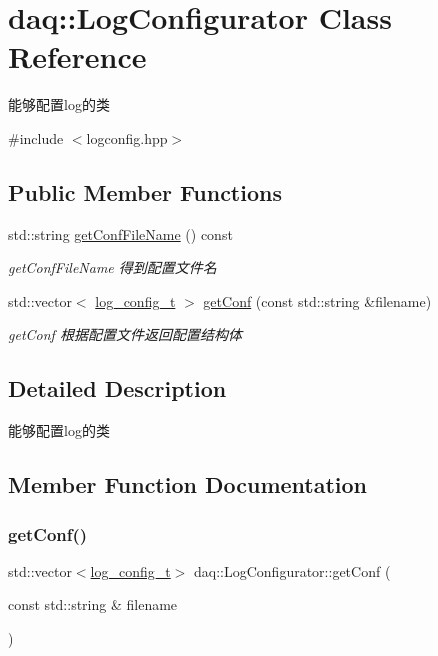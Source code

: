 \hypertarget{classdaq_1_1LogConfigurator}{}\section{daq\+:\+:Log\+Configurator Class Reference}
\label{classdaq_1_1LogConfigurator}


能够配置log的类  




{\ttfamily \#include $<$logconfig.\+hpp$>$}

\subsection*{Public Member Functions}
\begin{DoxyCompactItemize}
\item 
std\+::string \hyperlink{classdaq_1_1LogConfigurator_ab1053721ed0940c15397fe0dbf42560c}{get\+Conf\+File\+Name} () const
\begin{DoxyCompactList}\small\item\em get\+Conf\+File\+Name 得到配置文件名 \end{DoxyCompactList}\item 
std\+::vector$<$ \hyperlink{structdaq_1_1LogConfigStruct}{log\+\_\+config\+\_\+t} $>$ \hyperlink{classdaq_1_1LogConfigurator_a862bc0ecc399b8069aec436f855dd828}{get\+Conf} (const std\+::string \&filename)
\begin{DoxyCompactList}\small\item\em get\+Conf 根据配置文件返回配置结构体 \end{DoxyCompactList}\end{DoxyCompactItemize}


\subsection{Detailed Description}
能够配置log的类 

\subsection{Member Function Documentation}
\mbox{\label{classdaq_1_1LogConfigurator_a862bc0ecc399b8069aec436f855dd828}} 
\subsubsection{\texorpdfstring{get\+Conf()}{getConf()}}
{\footnotesize\ttfamily std\+::vector$<$\hyperlink{structdaq_1_1LogConfigStruct}{log\+\_\+config\+\_\+t}$>$ daq\+::\+Log\+Configurator\+::get\+Conf (\begin{DoxyParamCaption}\item[{const std\+::string \&}]{filename }\end{DoxyParamCaption})}



